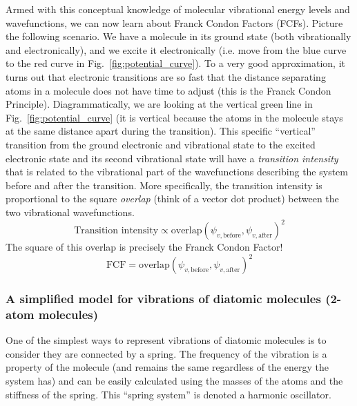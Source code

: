 \documentclass[12pt]{article}
\begin{document}
Armed with this conceptual knowledge of molecular vibrational energy levels and wavefunctions, we can now learn about Franck Condon Factors (FCFs). Picture the following scenario. We have a molecule in its ground state (both vibrationally and electronically), and we excite it electronically (i.e. move from the blue curve to the red curve in Fig.~\ref{fig:potential_curve}). To a very good approximation, it turns out that electronic transitions are so fast that the distance separating atoms in a molecule does not have time to adjust (this is the Franck Condon Principle). Diagrammatically, we are looking at the vertical green line in Fig.~\ref{fig:potential_curve} (it is vertical because the atoms in the molecule stays at the same distance apart during the transition). This specific ``vertical'' transition from the ground electronic and vibrational state to the excited electronic state and its second vibrational state will have a \textit{transition intensity} that is related to the vibrational part of the wavefunctions describing the system before and after the transition. More specifically, the transition intensity is proportional to the square \textit{overlap} (think of a vector dot product) between the two vibrational wavefunctions.
\begin{equation}
    \text{Transition}\text{ intensity} \propto \text{overlap}(\psi_{v,\text{before}},\psi_{v,\text{after}})^2
\end{equation}
The square of this overlap is precisely the Franck Condon Factor!
\begin{equation}
    \text{FCF} = \text{overlap}(\psi_{v,\text{before}},\psi_{v,\text{after}})^2
\end{equation}

\subsubsection{A simplified model for vibrations of diatomic molecules (2-atom molecules)}
One of the simplest ways to represent vibrations of diatomic molecules is to consider they are connected by a spring. The frequency of the vibration is a property of the molecule (and remains the same regardless of the energy the system has) and can be easily calculated using the masses of the atoms and the stiffness of the spring. This ``spring system'' is denoted a harmonic oscillator.
\end{document}
